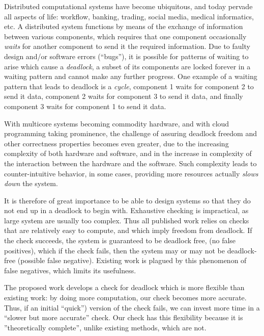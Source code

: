 Distributed computational systems have become ubiquitous, and today pervade all
aspects of life: workflow, banking, trading, social media, medical informatics,
etc.  A distributed system functions by means of the exchange of information
between various components, which requires that one component occasionally
\emph{waits} for another component to send it the required information.  Due to
faulty design and/or software errors (``bugs''), it is possible for patterns of
waiting to arise which cause a {\em deadlock}, \ie a subset of its components
are locked forever in a waiting pattern and cannot make any further progress.
One example of a waiting pattern that leads to deadlock is a \emph{cycle}, \eg
component 1 waits for component 2 to send it data, component 2 waits for
component 3 to send it data, and finally component 3 waits for component 1 to
send it data.

With multicore systems becoming commodity hardware, and with cloud programming
taking prominence, the challenge of assuring deadlock freedom and other
correctness properties becomes even greater, due to the increasing complexity of
both hardware and software, and in the increase in complexity of the interaction
between the hardware and the software. Such complexity leads to
counter-intuitive behavior, \eg in some cases, providing more resources actually
\emph{slows down} the system.

It is therefore of great importance to be able to design systems so that they do
not end up in a deadlock to begin with.  Exhaustive checking is impractical, as
large system are usually too complex. Thus all published work relies on checks
that are relatively easy to compute, and which imply freedom from deadlock. If
the check succeeds, the system is guaranteed to be deadlock free, (no false
positives), which if the check fails, then the system may or may not be
deadlock-free (possible false negative).  Existing work is plagued by this
phenomenon of false negatives, which limits its usefulness.

The proposed work develops a check for deadlock which is more flexible than
existing work: by doing more computation, our check becomes more accurate. Thus,
if an initial ``quick'') version of the check fails, we can invest more time in
a ``slower but more accurate'' check.  Our check has this flexibility because it
is ''theoretically complete'', unlike existing methods, which are not.



%
